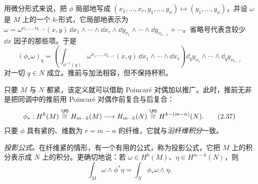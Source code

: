 
用微分形式来说，把 $\phi$ 局部地写成 $(x_1,\dots,x_r,y_1,\dots,y_n)\mapsto(y_1,\dots,y_n)$，并设 $\omega$ 是 $M$ 上的一个 $k$-形式，它局部地表示为 $\omega=\omega^{\nu_1,\dots,\nu_{k-r}}(x,y)\,\dd x_1\wedge\cdots\wedge \dd x_r\wedge \dd y_{\nu_1}\wedge\cdots\wedge \dd y_{\nu_{k-r}}+\cdots$。省略号代表含较少 $\dd x$ 因子的那些项。于是
\begin{equation}
  (\phi_*\omega)_q=\left(\int_{\phi^{-1}(q)}\omega^{\nu_1,\dots,\nu_{k-r}}(x,q)\,\dd x_1\wedge\cdots\wedge \dd x_r\right)\dd_q y_{\nu_1}\wedge\cdots\wedge \dd_q y_{\nu_{k-r}}
  \tag{2.36}
\end{equation}
对一切 $q\in N$ 成立。推前与加法相容，但不保持杯积。

只要 $M$ 与 $N$ 都紧，该定义就可以借助 Poincaré 对偶加以推广。此时，推前无非是把同调中的推前用 Poincaré 对偶作前复合与后复合：
\begin{equation}
  \phi_*:H^k(M)\overset{\PD}{\cong}H_{m-k}(M)\longrightarrow H_{m-k}(N)\overset{\PD}{\cong}H^{k-(m-n)}(N).
  \tag{2.37}
\end{equation}
只要 $\phi$ 具有紧的、维数为 $r=m-n$ 的纤维，它就与\emph{沿纤维积分}一致。

\emph{投影公式。}在纤维紧的情形，有一个有用的公式，称为投影公式，它把 $M$ 上的积分表示成 $N$ 上的积分。更确切地说：若 $\omega\in H^k(M)$、$\eta\in H^{m-k}(N)$，则
\begin{equation}
  \int_M\omega\wedge\phi^*\eta=\int_N\phi_*\omega\wedge\eta .
  \tag{2.38}
\end{equation}

